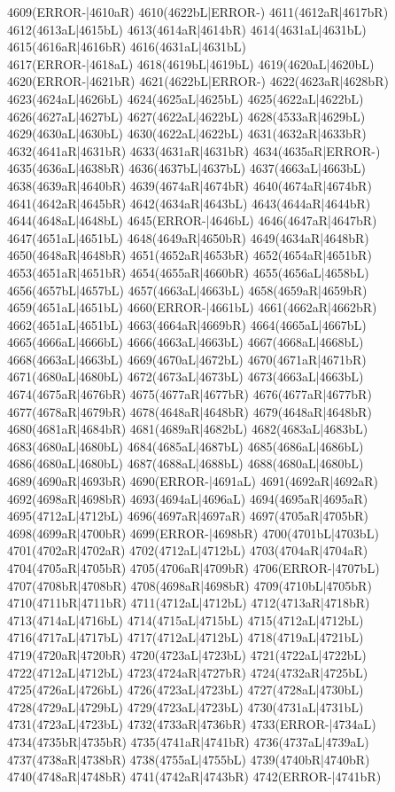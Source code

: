 4609(ERROR-|4610aR) 4610(4622bL|ERROR-) 4611(4612aR|4617bR) 4612(4613aL|4615bL) 4613(4614aR|4614bR) 4614(4631aL|4631bL) 4615(4616aR|4616bR) 4616(4631aL|4631bL) \\4617(ERROR-|4618aL) 4618(4619bL|4619bL) 4619(4620aL|4620bL) 4620(ERROR-|4621bR) 4621(4622bL|ERROR-) 4622(4623aR|4628bR) 4623(4624aL|4626bL) 4624(4625aL|4625bL) 4625(4622aL|4622bL) \\4626(4627aL|4627bL) 4627(4622aL|4622bL) 4628(4533aR|4629bL) 4629(4630aL|4630bL) 4630(4622aL|4622bL) 4631(4632aR|4633bR) 4632(4641aR|4631bR) 4633(4631aR|4631bR) 4634(4635aR|ERROR-) \\4635(4636aL|4638bR) 4636(4637bL|4637bL) 4637(4663aL|4663bL) 4638(4639aR|4640bR) 4639(4674aR|4674bR) 4640(4674aR|4674bR) 4641(4642aR|4645bR) 4642(4634aR|4643bL) 4643(4644aR|4644bR) \\4644(4648aL|4648bL) 4645(ERROR-|4646bL) 4646(4647aR|4647bR) 4647(4651aL|4651bL) 4648(4649aR|4650bR) 4649(4634aR|4648bR) 4650(4648aR|4648bR) 4651(4652aR|4653bR) 4652(4654aR|4651bR) \\4653(4651aR|4651bR) 4654(4655aR|4660bR) 4655(4656aL|4658bL) 4656(4657bL|4657bL) 4657(4663aL|4663bL) 4658(4659aR|4659bR) 4659(4651aL|4651bL) 4660(ERROR-|4661bL) 4661(4662aR|4662bR) \\4662(4651aL|4651bL) 4663(4664aR|4669bR) 4664(4665aL|4667bL) 4665(4666aL|4666bL) 4666(4663aL|4663bL) 4667(4668aL|4668bL) 4668(4663aL|4663bL) 4669(4670aL|4672bL) 4670(4671aR|4671bR) \\4671(4680aL|4680bL) 4672(4673aL|4673bL) 4673(4663aL|4663bL) 4674(4675aR|4676bR) 4675(4677aR|4677bR) 4676(4677aR|4677bR) 4677(4678aR|4679bR) 4678(4648aR|4648bR) 4679(4648aR|4648bR) \\4680(4681aR|4684bR) 4681(4689aR|4682bL) 4682(4683aL|4683bL) 4683(4680aL|4680bL) 4684(4685aL|4687bL) 4685(4686aL|4686bL) 4686(4680aL|4680bL) 4687(4688aL|4688bL) 4688(4680aL|4680bL) \\4689(4690aR|4693bR) 4690(ERROR-|4691aL) 4691(4692aR|4692aR) 4692(4698aR|4698bR) 4693(4694aL|4696aL) 4694(4695aR|4695aR) 4695(4712aL|4712bL) 4696(4697aR|4697aR) 4697(4705aR|4705bR) \\4698(4699aR|4700bR) 4699(ERROR-|4698bR) 4700(4701bL|4703bL) 4701(4702aR|4702aR) 4702(4712aL|4712bL) 4703(4704aR|4704aR) 4704(4705aR|4705bR) 4705(4706aR|4709bR) 4706(ERROR-|4707bL) \\4707(4708bR|4708bR) 4708(4698aR|4698bR) 4709(4710bL|4705bR) 4710(4711bR|4711bR) 4711(4712aL|4712bL) 4712(4713aR|4718bR) 4713(4714aL|4716bL) 4714(4715aL|4715bL) 4715(4712aL|4712bL) \\4716(4717aL|4717bL) 4717(4712aL|4712bL) 4718(4719aL|4721bL) 4719(4720aR|4720bR) 4720(4723aL|4723bL) 4721(4722aL|4722bL) 4722(4712aL|4712bL) 4723(4724aR|4727bR) 4724(4732aR|4725bL) \\4725(4726aL|4726bL) 4726(4723aL|4723bL) 4727(4728aL|4730bL) 4728(4729aL|4729bL) 4729(4723aL|4723bL) 4730(4731aL|4731bL) 4731(4723aL|4723bL) 4732(4733aR|4736bR) 4733(ERROR-|4734aL) \\4734(4735bR|4735bR) 4735(4741aR|4741bR) 4736(4737aL|4739aL) 4737(4738aR|4738bR) 4738(4755aL|4755bL) 4739(4740bR|4740bR) 4740(4748aR|4748bR) 4741(4742aR|4743bR) 4742(ERROR-|4741bR) 
